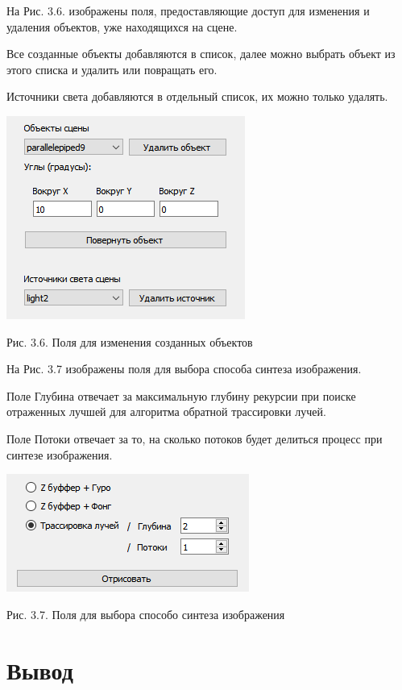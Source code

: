 \documentclass[12pt]{report}
\begin{document}
	На Рис. 3.6. изображены поля, предоставляющие доступ для изменения и удаления объектов, уже находящихся на сцене.
	
	Все созданные объекты добавляются в список, далее можно выбрать объект из этого списка и удалить или повращать его.
	
	Источники света добавляются в отдельный список, их можно только удалять.

	\begin{center}
		\includegraphics[scale=1]{changes.png}
		
		Рис. 3.6. Поля для изменения созданных объектов
	\end{center}
	
	На Рис. 3.7 изображены поля для выбора способа синтеза изображения.
	
	Поле Глубина отвечает за максимальную глубину рекурсии при поиске отраженных лучшей для алгоритма обратной трассировки лучей.
	
	Поле Потоки отвечает за то, на сколько потоков будет делиться процесс при синтезе изображения.
	
	\begin{center}
		\includegraphics[scale=1]{choose.png}
		
		Рис. 3.7. Поля для выбора способо синтеза изображения
	\end{center}

	\section*{Вывод}
	
\end{document}
